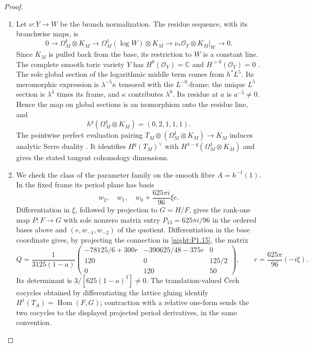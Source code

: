 \documentclass[11pt,a4paper]{article}
\numberwithin{equation}{section}
\theoremstyle{definition}
\begin{document}
\begin{proof}
\begin{enumerate}[label=\arabic*.]
\item Let $\nu:Y\to W$ be the branch normalization.  The residue
sequence, with its branchwise maps, is
\[
0\longrightarrow\Omega^1_M\otimes K_M
\longrightarrow\Omega^1_M(\log W)\otimes K_M
\longrightarrow\nu_*\mathcal O_Y\otimes K_M|_W
\longrightarrow0.
\]
Since $K_M$ is pulled back from the base, its restriction to $W$ is
a constant line.  The complete smooth toric variety $Y$ has
$H^0(\mathcal O_Y)=\mathbb C$ and $H^{>0}(\mathcal O_Y)=0$
\cite[Theorem~9.2.3, p.~410, with divisor zero]{CoxLittleSchenck2011}.
The sole global section of the logarithmic middle term comes from
$h^*L^5$.  Its meromorphic expression is
$\lambda^{-5}\kappa$ tensored with the $L^{-6}$-frame: the
unique $L^5$ section is $\lambda^4$ times its frame, and
$\kappa$ contributes $\lambda^9$.  Its residue at $a$ is
$a^{-5}\ne0$.  Hence the map on global sections is an isomorphism
onto the residue line, and
\[
h^q(\Omega^1_M\otimes K_M)=(0,2,1,1,1).
\]
The pointwise perfect evaluation pairing
$T_M\otimes(\Omega^1_M\otimes K_M)\to K_M$ induces analytic
Serre duality
\cite[\S13, Theorem~4, p.~22; \S15, p.~23]{Serre1955Duality}.
It identifies $H^q(T_M)^\vee$ with
$H^{4-q}(\Omega^1_M\otimes K_M)$ and gives the stated tangent
cohomology dimensions.

\item We check the class of the parameter family on the
smooth fibre $A=h^{-1}(1)$.  In the fixed frame its period plane
has basis
\[
w_2,\quad w_1,\quad w_0+\frac{625\pi i}{96}\xi e.
\]
Differentiation in $\xi$, followed by projection to $G=H/F$,
gives the rank-one map $P:F\to G$ with sole nonzero matrix entry
$P_{13}=625\pi i/96$ in the ordered bases above and
$(e,w_{-1},w_{-2})$ of the quotient.
Differentiation in the base coordinate gives, by projecting the
connection in \cref{night:P1.15}, the matrix
\[
Q=\frac1{3125(1-a)}
\begin{pmatrix}
-78125/6+300r&-390625/48-375r&0\\
120&0&125/2\\
0&120&50
\end{pmatrix},
\qquad r=\frac{625\pi}{96}(-i\xi).
\]
Its determinant is $3/[625(1-a)^3]\ne0$.
The translation-valued \v Cech cocycles obtained by differentiating
the lattice gluing identify
$H^1(T_A)=\operatorname{Hom}(F,G)$; contraction with a relative
one-form sends the two cocycles to the displayed projected period
derivatives, in the same convention.


\end{enumerate}
\end{proof}
\end{document}
